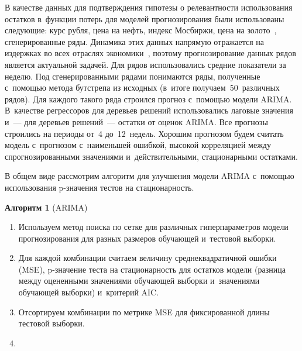 \begin{multicols}{2}
В качестве данных для подтверждения гипотезы о релевантности использования остатков 
в~функции потерь для моделей прогнозирования были использованы следующие: курс рубля, цена на нефть, 
индекс Мосбиржи, цена на золото~\cite{23-kr}, сгенерированные ряды. Динамика этих данных напрямую 
отражается на издержках во всех отраслях экономики~\cite{24-kr}, поэтому прогнозирование данных рядов 
является актуальной задачей. Для рядов использовались средние показатели за неделю. 
Под сгенерированными рядами понимаются ряды, полученные с~по\-мощью метода бутстрепа из 
исходных (в~итоге получаем~50~различных рядов). Для каждого такого ряда строился прогноз с~по\-мощью 
модели ARIMA. В~качестве регрессоров для деревьев решений использовались лаговые значения 
и~--- для деревьев решений~--- остатки от оценок ARIMA. Все прогнозы строились на периоды от~4 до~12~недель. 
Хорошим прогнозом будем считать модель с~прогнозом с~наименьшей ошибкой, высокой корреляцией 
между спрогнозированными значениями и~действительными, стационарными остатками.

В общем виде рассмотрим алгоритм для улучшения модели ARIMA с~помощью использования
 p-зна\-че\-ния тес\-тов на ста\-цио\-нар\-ность.
\ %


\vspace*{2pt}

\textbf{Алгоритм 1} (ARIMA) %
    
        \noindent
        \begin{enumerate}[1.]

       
        \item
        Используем метод поиска по сетке для различных гиперпараметров 
        модели прогнозирования для разных размеров обучающей и~тестовой выборки.
        
        \item
        Для каждой комбинации считаем величину среднеквадратичной ошибки (MSE), 
        p-зна\-че\-ние теста на стационарность для остатков модели (разница 
        между оцененными значениями обучающей выборки и~значениями обучающей выборки) и~критерий AIC.
        
        
        \item
        Отсортируем комбинации по метрике MSE для фиксированной длины тестовой выборки.
        \item
        

\end{enumerate}
\end{multicols}
